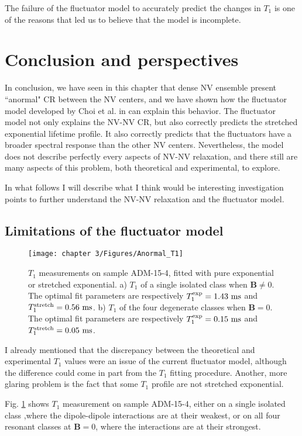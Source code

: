 \documentclass[a4paper,11pt]{report}
\begin{document}
\begin{refsection}
The failure of the fluctuator model to accurately predict the changes in $T_1$ is one of the reasons that led us to believe that the model is incomplete.

\section{Conclusion and perspectives}

In conclusion, we have seen in this chapter that dense NV ensemble present ``anormal" CR between the NV centers, and we have shown how the fluctuator model developed by Choi et al. in \citep{choi2017depolarization} can explain this behavior. The fluctuator model not only explains the NV-NV CR, but also correctly predicts the stretched exponential lifetime profile. It also correctly predicts that the fluctuators have a broader spectral response than the other NV centers. Nevertheless, the model does not describe perfectly every aspects of NV-NV relaxation, and there still are many aspects of this problem, both theoretical and experimental, to explore.

In what follows I will describe what I think would be interesting investigation points to further understand the NV-NV relaxation and the fluctuator model.

\subsection{Limitations of the fluctuator model}
\begin{figure}[h]
\centering
\texttt{[image: chapter 3/Figures/Anormal\_T1]}
\caption{$T_1$ measurements on sample ADM-15-4, fitted with pure exponential or stretched exponential. a) $T_1$ of a single isolated class when $\mathbf{B} \neq 0$. The optimal fit parameters are respectively $T_1^{\rm exp}=1.43\ \rm ms$ and $T_1^{\rm stretch}=0.56\ \rm ms$. b) $T_1$ of the four degenerate classes when $\mathbf{B}=0$. The optimal fit parameters are respectively $T_1^{\rm exp}=0.15\ \rm ms$ and $T_1^{\rm stretch}=0.05\ \rm ms$.}
\label{anormal T1}
\end{figure}

I already mentioned that the discrepancy between the theoretical and experimental $T_1$  values were an issue of the current fluctuator model, although the difference could come in part from the $T_1$ fitting procedure. Another, more glaring problem is the fact that some $T_1$ profile are not stretched exponential.

Fig. \ref{anormal T1} shows $T_1$ measurement on sample ADM-15-4, either on a single isolated class ,where the dipole-dipole interactions are at their weakest, or on all four resonant classes at $\mathbf{B}=0$, where the interactions are at their strongest.


\end{refsection}
\end{document}
